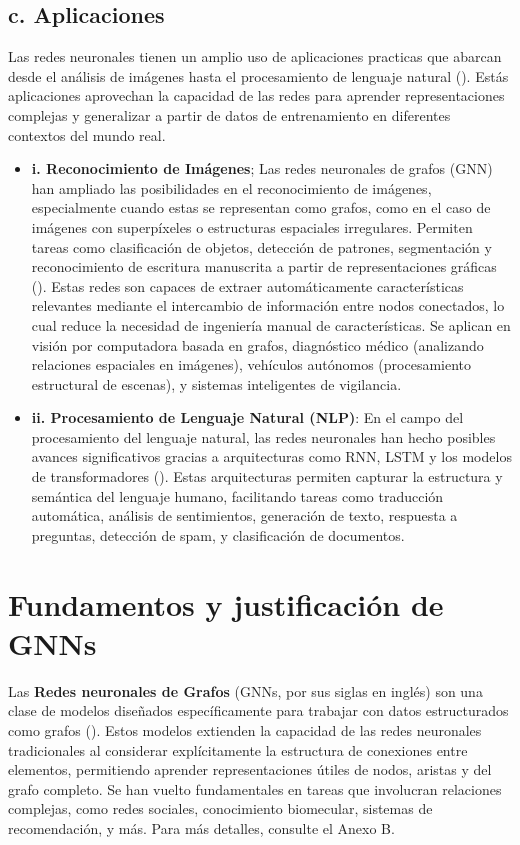 \documentclass[11pt]{article} %
\begin{document}
\subsection{c. Aplicaciones} 
\vspace{3pt}
Las redes neuronales tienen un amplio uso de aplicaciones practicas que abarcan desde el análisis de imágenes hasta el procesamiento de lenguaje natural (\cite{hui2021gnn}). Estás aplicaciones aprovechan la capacidad de las redes para aprender representaciones complejas y generalizar a partir de datos de entrenamiento en diferentes contextos del mundo real.
\begin{itemize}
\item \textbf{i. Reconocimiento de Imágenes}; \newline
Las redes neuronales de grafos (GNN) han ampliado las posibilidades en el reconocimiento de imágenes, especialmente cuando estas se representan como grafos, como en el caso de imágenes con superpíxeles o estructuras espaciales irregulares. Permiten tareas como clasificación de objetos, detección de patrones, segmentación y reconocimiento de escritura manuscrita a partir de representaciones gráficas (\cite{hui2021gnn}). Estas redes son capaces de extraer automáticamente características relevantes mediante el intercambio de información entre nodos conectados, lo cual reduce la necesidad de ingeniería manual de características. Se aplican en visión por computadora basada en grafos, diagnóstico médico (analizando relaciones espaciales en imágenes), vehículos autónomos (procesamiento estructural de escenas), y sistemas inteligentes de vigilancia.


    \item \textbf{ii. Procesamiento de Lenguaje Natural (NLP)}: \newline
    En el campo del procesamiento del lenguaje natural, las redes neuronales han hecho posibles avances significativos gracias a arquitecturas como RNN, LSTM y los modelos de transformadores (\cite{aws2025nlp}). Estas arquitecturas permiten capturar la estructura y semántica del lenguaje humano, facilitando tareas como traducción automática, análisis de sentimientos, generación de texto, respuesta a preguntas, detección de spam, y clasificación de documentos.
    

\end{itemize}
\newpage
{\section{Fundamentos y justificación de GNNs}} 
\vspace{5pt}
Las \textbf{Redes neuronales de Grafos} (GNNs, por sus siglas en inglés) son una clase de modelos diseñados específicamente para trabajar con datos estructurados como grafos (\cite{hui2021gnn}). Estos modelos extienden la capacidad de las redes neuronales tradicionales al considerar explícitamente la estructura de conexiones entre elementos, permitiendo aprender representaciones útiles de nodos, aristas y del grafo completo. Se han vuelto fundamentales en tareas que involucran relaciones complejas, como redes sociales, conocimiento biomecular, sistemas de recomendación, y más. Para más detalles, consulte el Anexo B.
\vspace{3pt}
\end{document}

